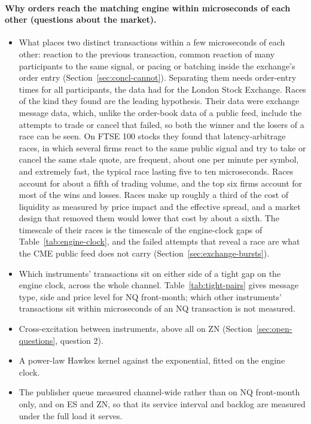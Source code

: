 \documentclass[11pt]{article}
\begin{document}
\paragraph{Why orders reach the matching engine within microseconds of each other (questions about the market).}
\begin{itemize}
    \item What places two distinct transactions within a few microseconds of each other:
reaction to the previous transaction, common reaction of many participants to the same
signal, or pacing or batching inside the exchange's order entry (Section~\ref{sec:concl-cannot}).
Separating them needs order-entry times for all participants, the data
\citet{aquilina2022arms} had for the London Stock Exchange. Races of the kind they found
are the leading hypothesis. Their data were exchange message data, which, unlike the
order-book data of a public feed, include the attempts to trade or cancel that failed, so
both the winner and the losers of a race can be seen. On FTSE 100 stocks they found that latency-arbitrage races, in which several firms
react to the same public signal and try to take or cancel the same stale quote, are
frequent, about one per minute per symbol, and extremely fast, the typical race lasting
five to ten microseconds. Races account for about a fifth of trading volume, and the top
six firms account for most of the wins and losses. Races make up roughly a third of the
cost of liquidity as measured by price impact and the effective spread, and a market
design that removed them would lower that cost by about a sixth. The timescale of their races is the timescale of the engine-clock
gaps of Table~\ref{tab:engine-clock}, and the failed attempts that reveal a race are what
the CME public feed does not carry (Section~\ref{sec:exchange-bursts}).
    \item Which instruments' transactions sit on either side of a tight gap on the engine
clock, across the whole channel. Table~\ref{tab:tight-pairs} gives message type, side and price level for NQ
front-month; which other instruments' transactions sit within microseconds of an NQ
transaction is not measured.
    \item Cross-excitation between instruments, above all on ZN
(Section~\ref{sec:open-questions}, question 2).
    \item A power-law Hawkes kernel against the exponential, fitted on the engine clock.
    \item The publisher queue measured channel-wide rather than on NQ front-month only, and
on ES and ZN, so that its service interval and backlog are measured under the full load it
serves.
\end{itemize}
\end{document}
